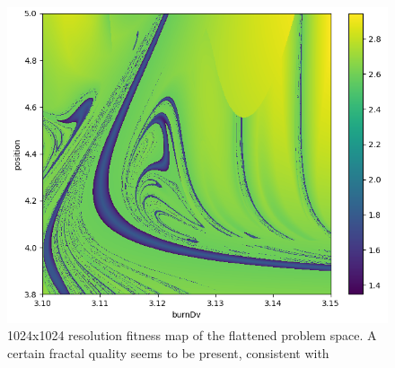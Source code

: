 \begin{figure}[ht]
    \centering
    \includegraphics[width=\linewidth]{fig/golf_course_s1024.png}
    \caption{1024x1024 resolution fitness map of the flattened problem space. A certain fractal quality seems to be present, consistent with \cite{Topputo2014}}
    \label{fig:golf_course_s1024}
\end{figure}